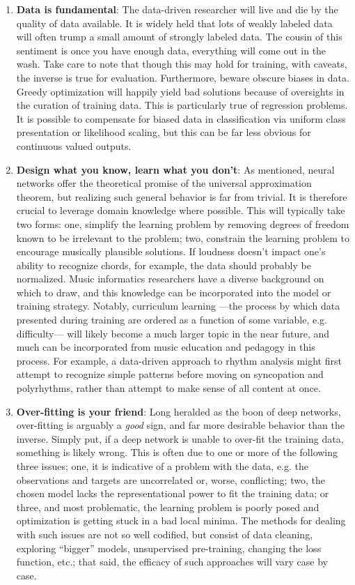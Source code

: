 \begin{enumerate}

\item \textbf{Data is fundamental}:
The data-driven researcher will live and die by the quality of data available.
It is widely held that lots of weakly labeled data will often trump a small amount of strongly labeled data.
The cousin of this sentiment is once you have enough data, everything will come out in the wash.
Take care to note that though this may hold for training, with caveats, the inverse is true for evaluation.
Furthermore, beware obscure biases in data.
Greedy optimization will happily yield bad solutions because of oversights in the curation of training data.
This is particularly true of regression problems.
It is possible to compensate for biased data in classification via uniform class presentation or likelihood scaling, but this can be far less obvious for continuous valued outputs.


\item \textbf{Design what you know, learn what you don't}:
As mentioned, neural networks offer the theoretical promise of the universal approximation theorem, but realizing such general behavior is far from trivial.
It is therefore crucial to leverage domain knowledge where possible.
This will typically take two forms:
one, simplify the learning problem by removing degrees of freedom known to be irrelevant to the problem;
two, constrain the learning problem to encourage musically plausible solutions.
If loudness doesn't impact one's ability to recognize chords, for example, the data should probably be normalized.
Music informatics researchers have a diverse background on which to draw, and this knowledge can be incorporated into the model or training strategy.
Notably, curriculum learning ---the process by which data presented during training are ordered as a function of some variable, e.g. difficulty--- will likely become a much larger topic in the near future, and much can be incorporated from music education and pedagogy in this process.
For example, a data-driven approach to rhythm analysis might first attempt to recognize simple patterns before moving on syncopation and polyrhythms, rather than attempt to make sense of all content at once.


\item \textbf{Over-fitting is your friend}:
Long heralded as the boon of deep networks, over-fitting is arguably a \emph{good} sign, and far more desirable behavior than the inverse.
Simply put, if a deep network is unable to over-fit the training data, something is likely wrong.
This is often due to one or more of the following three issues;
one, it is indicative of a problem with the data, e.g. the observations and targets are uncorrelated or, worse, conflicting;
two, the chosen model lacks the representational power to fit the training data;
or three, and most problematic, the learning problem is poorly posed and optimization is getting stuck in a bad local minima.
The methods for dealing with such issues are not so well codified, but consist of data cleaning, exploring ``bigger'' models, unsupervised pre-training, changing the loss function, etc.; that said, the efficacy of such approaches will vary case by case.



\end{enumerate}
